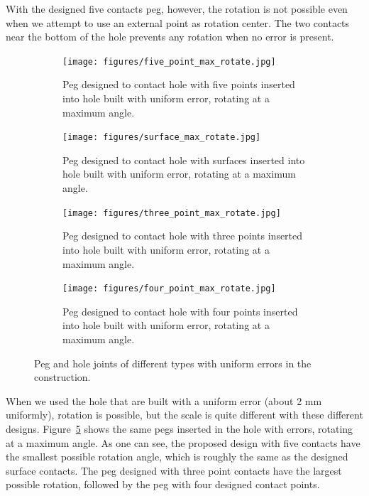 \documentclass[11pt, twocolumn]{article}
\begin{document}
With the designed five contacts peg, however, the rotation is not possible even when we attempt to use an external point as rotation center. The two contacts near the bottom of the hole prevents any rotation  when no error is present. 



\begin{figure}
\begin{center}
\begin{subfigure}[t]{0.24\textwidth}
\begin{center}
\texttt{[image: figures/five\_point\_max\_rotate.jpg]}
\end{center}
\label{fig:five_point_max_rotate}
\caption{Peg designed to contact hole with five points inserted into hole built with uniform error, rotating at a maximum angle. }
\end{subfigure}
\begin{subfigure}[t]{0.24\textwidth}
\begin{center}
\texttt{[image: figures/surface\_max\_rotate.jpg]}
\end{center}
\label{fig:surface_point_max_rotate}
\caption{Peg designed to contact hole with surfaces inserted into hole built with uniform error, rotating at a maximum angle.  }
\end{subfigure}
\begin{subfigure}[t]{0.24\textwidth}
\begin{center}
\texttt{[image: figures/three\_point\_max\_rotate.jpg]}
\end{center}
\label{fig:three_point_max_rotate}
\caption{Peg designed to contact hole with three points inserted into hole built with uniform error, rotating at a maximum angle.  }
\end{subfigure}
\begin{subfigure}[t]{0.24\textwidth}
\begin{center}
\texttt{[image: figures/four\_point\_max\_rotate.jpg]}
\end{center}
\label{fig:four_point_max_rotate}
\caption{Peg designed to contact hole with four points inserted into hole built with uniform error, rotating at a maximum angle. }
\end{subfigure}
\end{center}
\label{fig:hole_error}
\caption{Peg and hole joints of different types with uniform errors in the construction. }
\end{figure}

When we used the hole that are built with a uniform error (about 2 mm uniformly), rotation is possible, but the scale is quite different with these different designs. Figure~\ref{fig:hole_error} shows the same pegs inserted in the hole with errors, rotating at a maximum angle. As one can see, the proposed design with five contacts have the smallest possible rotation angle, which is roughly the same as the designed surface contacts. The peg designed with three point contacts have the largest possible rotation, followed by the peg with four designed contact points. 
\end{document}

